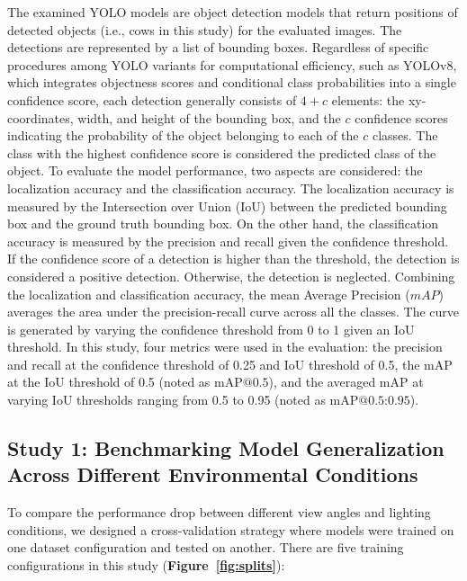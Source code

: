 The examined YOLO models are object detection models that return positions of detected objects (i.e., cows in this study) for the evaluated images. The detections are represented by a list of bounding boxes. Regardless of specific procedures among YOLO variants for computational efficiency, such as YOLOv8, which integrates objectness scores and conditional class probabilities into a single confidence score, each detection generally consists of $4+c$ elements: the xy-coordinates, width, and height of the bounding box, and the $c$ confidence scores indicating the probability of the object belonging to each of the $c$ classes. The class with the highest confidence score is considered the predicted class of the object. To evaluate the model performance, two aspects are considered: the localization accuracy and the classification accuracy. The localization accuracy is measured by the Intersection over Union (IoU) between the predicted bounding box and the ground truth bounding box. On the other hand, the classification accuracy is measured by the precision and recall given the confidence threshold. If the confidence score of a detection is higher than the threshold, the detection is considered a positive detection. Otherwise, the detection is neglected. Combining the localization and classification accuracy, the mean Average Precision ($mAP$) averages the area under the precision-recall curve across all the classes. The curve is generated by varying the confidence threshold from 0 to 1 given an IoU threshold. In this study, four metrics were used in the evaluation: the precision and recall at the confidence threshold of 0.25 and IoU threshold of 0.5, the mAP at the IoU threshold of 0.5 (noted as $\text{mAP@{0.5}}$), and the averaged mAP at varying IoU thresholds ranging from 0.5 to 0.95 (noted as $\text{mAP@{0.5:0.95}}$).

\subsection*{Study 1: Benchmarking Model Generalization Across Different Environmental Conditions}

To compare the performance drop between different view angles and lighting conditions, we designed a cross-validation strategy where models were trained on one dataset configuration and tested on another. There are five training configurations in this study (\textbf{Figure~\ref{fig:splits}}):

